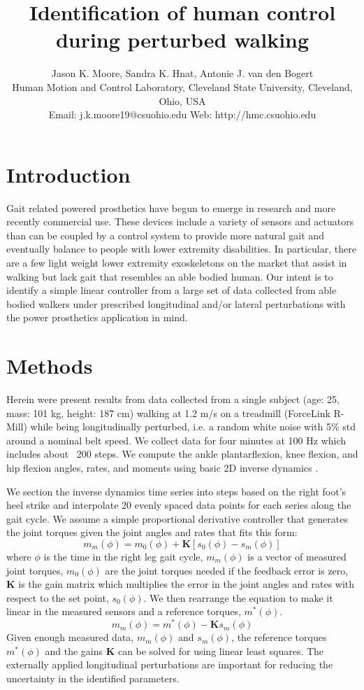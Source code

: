 \documentclass[10pt,letterpaper,notitlepage,twocolumn]{article}
\title{Identification of human control during perturbed walking}
\author{
  Jason K. Moore, Sandra K. Hnat, Antonie J. van den Bogert\\
  Human Motion and Control Laboratory, Cleveland State University, Cleveland, Ohio, USA\\
  Email: j.k.moore19@csuohio.edu Web: http://hmc.csuohio.edu
}
\date{}
\begin{document}

\maketitle

\section*{Introduction}
%
Gait related powered prosthetics have begun to emerge in research and more
recently commercial use. These devices include a variety of sensors and
actuators than can be coupled by a control system to provide more natural gait
and eventually balance to people with lower extremity disabilities. In
particular, there are a few light weight lower extremity exoskeletons on the
market that assist in walking but lack gait that resembles an able bodied
human. Our intent is to identify a simple linear controller from a large set of
data collected from able bodied walkers under prescribed longitudinal and/or
lateral perturbations with the power prosthetics application in mind.
%
\section*{Methods}
%
Herein were present results from data collected from a single subject (age: 25,
mass: 101 kg, height: 187 cm) walking at 1.2 m/s on a treadmill (ForceLink
R-Mill) while being longitudinally perturbed, i.e. a random white noise with
5\% std around a nominal belt speed. We collect data for four minutes at 100 Hz
which includes about ~200 steps. We compute the ankle plantarflexion, knee
flexion, and hip flexion angles, rates, and moments using basic 2D inverse
dynamics \cite{Winter}. %

We section the inverse dynamics time series into steps based on the right
foot's heel strike and interpolate 20 evenly spaced data points for each series
along the gait cycle. We assume a simple proportional derivative controller
that generates the joint torques given the joint angles and rates that fits
this form:
%
\begin{equation}
  m_m(\phi) = m_0(\phi) + \mathbf{K}[s_0(\phi) - s_m(\phi)]
\end{equation}
%
where $\phi$ is the time in the right leg gait cycle, $m_m(\phi)$ is a vector
of measured joint torques, $m_0(\phi)$ are the joint torques needed if the
feedback error is zero, $\mathbf{K}$ is the gain matrix which multiplies the
error in the joint angles and rates with respect to the set point, $s_0(\phi)$.
We then rearrange the equation to make it linear in the measured sensors and a
reference torques, $m^*(\phi)$.
%
\begin{equation}
  m_m(\phi) = m^*(\phi) - \mathbf{K}s_m(\phi)
\end{equation}
%
Given enough measured data, $m_m(\phi)$ and $s_m(\phi)$, the reference torques
$m^*(\phi)$ and the gains $\mathbf{K}$ can be solved for using linear least
squares. The externally applied longitudinal perturbations are important for
reducing the uncertainty in the identified parameters.
%
\end{document}
